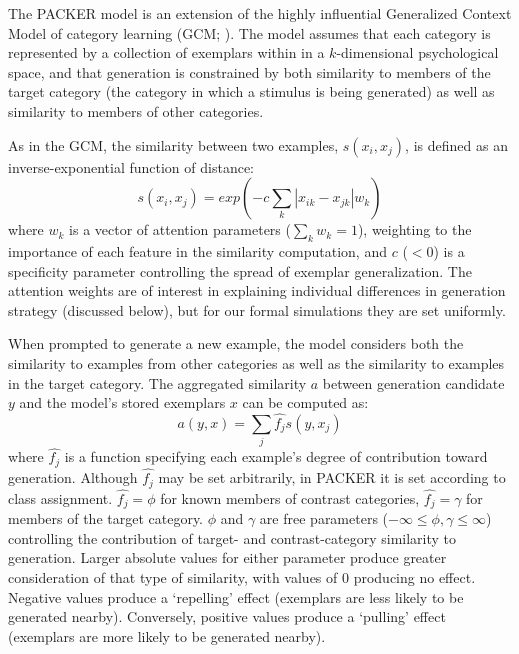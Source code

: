 \documentclass[10pt,letterpaper]{article}
\begin{document}
The PACKER model is an extension of the highly influential Generalized Context Model of category learning (GCM; \citealp{nosofsky1984choice}). The model assumes that each category is represented by a collection of exemplars within in a $k$-dimensional psychological space, and that generation is constrained by both similarity to members of the target category (the category in which a stimulus is being generated) as well as similarity to members of other categories. 

As in the GCM, the similarity between two examples, $s(x_i, x_j)$, is defined as an inverse-exponential function of distance:
\begin{equation}
  s(x_i,x_j) = exp( -c \sum_{k}{|x_{ik} - x_{jk}|}w_k )
  \label{eq:similarity}
\end{equation}
where $w_k$ is a vector of attention parameters ($\sum_k{w_k} = 1$), weighting to the importance of each feature in the similarity computation, and $c$ ($<0$) is a specificity parameter controlling the spread of exemplar generalization. The attention weights are of interest in explaining individual differences in generation strategy (discussed below), but for our formal simulations they are set uniformly.

When prompted to generate a new example, the model considers both the similarity to examples from other categories as well as the similarity to examples in the target category. The aggregated similarity $a$ between generation candidate $y$ and the model's stored exemplars $x$ can be computed as:
\begin{equation}
  a(y, x) = \sum_j{\hat{f_j} s(y, x_j)}
  \label{eq:packer-ss}
\end{equation}
where $\hat{f_j}$ is a function specifying each example's degree of contribution toward generation. Although $\hat{f_j}$ may be set arbitrarily, in PACKER it is set according to class assignment. $\hat{f_j} = \phi$ for known members of contrast categories, $\hat{f_j} = \gamma$ for members of the target category. $\phi$ and $\gamma$ are free parameters ($-\infty \leq \phi, \gamma \leq \infty$) controlling the contribution of target- and contrast-category similarity to generation. Larger absolute values for either parameter produce greater consideration of that type of similarity, with values of 0 producing no effect. Negative values produce a `repelling' effect (exemplars are less likely to be generated nearby). Conversely, positive values produce a `pulling' effect (exemplars are more likely to be generated nearby). 
\end{document}

